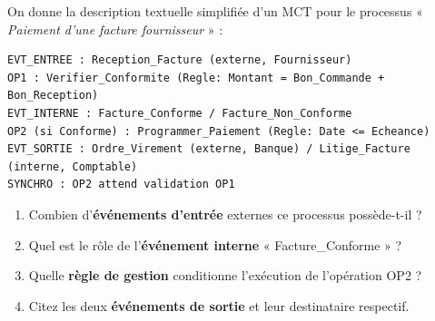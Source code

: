 \documentclass[11pt]{article}
\begin{document}
\begin{exercice}
On donne la description textuelle simplifiée d'un MCT pour le processus « \textit{Paiement d'une facture fournisseur} » :
\begin{verbatim}
EVT_ENTREE : Reception_Facture (externe, Fournisseur)
OP1 : Verifier_Conformite (Regle: Montant = Bon_Commande + Bon_Reception)
EVT_INTERNE : Facture_Conforme / Facture_Non_Conforme
OP2 (si Conforme) : Programmer_Paiement (Regle: Date <= Echeance)
EVT_SORTIE : Ordre_Virement (externe, Banque) / Litige_Facture (interne, Comptable)
SYNCHRO : OP2 attend validation OP1
\end{verbatim}
\begin{enumerate}
    \item Combien d'\textbf{événements d'entrée} externes ce processus possède-t-il ?
    \item Quel est le rôle de l'\textbf{événement interne} « Facture\_Conforme » ?
    \item Quelle \textbf{règle de gestion} conditionne l'exécution de l'opération OP2 ?
    \item Citez les deux \textbf{événements de sortie} et leur destinataire respectif.
\end{enumerate}
\end{exercice}
\end{document}
